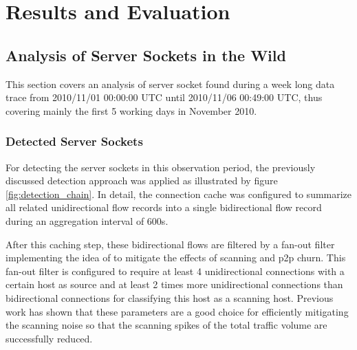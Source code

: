 

\chapter{Results and Evaluation 
\label{chapter:results}}


\section{Analysis of Server Sockets in the Wild}

This section covers an analysis of \gls{server socket} found during a
week long data trace from 2010/11/01 00:00:00 UTC until 2010/11/06 00:49:00 UTC,
thus covering mainly the first 5 working days in November 2010.

\subsection{Detected Server Sockets}

For detecting the \glspl{server socket} in this observation period, the
previously discussed detection approach was applied as illustrated by figure
\ref{fig:detection_chain}. In detail, the connection cache was configured to
summarize all related unidirectional flow records into a single bidirectional
flow record during an aggregation interval of 600s.

After this caching step, these bidirectional flows are filtered by a fan-out
filter implementing the idea of \citet{Allman:2007} to mitigate the effects of
scanning and \gls{p2p} churn. This fan-out filter is configured to require at
least 4 unidirectional connections with a certain host as source and at least 2
times more unidirectional connections than bidirectional connections for
classifying this host as a scanning host.
Previous work\citep{Schatzmann:Mining,Schatzmann:Dissection, Schatzmann:Tracing}
has shown that these parameters are a good choice for efficiently mitigating the
scanning noise so that the scanning spikes of the total traffic volume are
successfully reduced.

